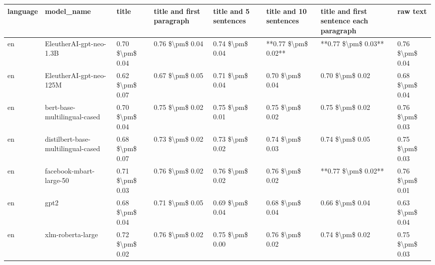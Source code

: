 \begin{tabular}{llllllll}
\toprule
language &                         model\_name &           title & title and first paragraph & title and 5 sentences & title and 10 sentences & title and first sentence each paragraph &            raw text \\
\midrule
      en &            EleutherAI-gpt-neo-1.3B & 0.70 \$\textbackslash pm\$ 0.04 &           0.76 \$\textbackslash pm\$ 0.04 &       0.74 \$\textbackslash pm\$ 0.04 &    **0.77 \$\textbackslash pm\$ 0.02** &                     **0.77 \$\textbackslash pm\$ 0.03** &     0.76 \$\textbackslash pm\$ 0.04 \\
      en &            EleutherAI-gpt-neo-125M & 0.62 \$\textbackslash pm\$ 0.07 &           0.67 \$\textbackslash pm\$ 0.05 &       0.71 \$\textbackslash pm\$ 0.04 &        0.70 \$\textbackslash pm\$ 0.04 &                         0.70 \$\textbackslash pm\$ 0.02 &     0.68 \$\textbackslash pm\$ 0.04 \\
      en &       bert-base-multilingual-cased & 0.70 \$\textbackslash pm\$ 0.04 &           0.75 \$\textbackslash pm\$ 0.02 &       0.75 \$\textbackslash pm\$ 0.01 &        0.75 \$\textbackslash pm\$ 0.02 &                         0.75 \$\textbackslash pm\$ 0.02 &     0.76 \$\textbackslash pm\$ 0.03 \\
      en & distilbert-base-multilingual-cased & 0.68 \$\textbackslash pm\$ 0.07 &           0.73 \$\textbackslash pm\$ 0.02 &       0.73 \$\textbackslash pm\$ 0.02 &        0.74 \$\textbackslash pm\$ 0.03 &                         0.74 \$\textbackslash pm\$ 0.05 &     0.75 \$\textbackslash pm\$ 0.03 \\
      en &            facebook-mbart-large-50 & 0.71 \$\textbackslash pm\$ 0.03 &           0.76 \$\textbackslash pm\$ 0.02 &       0.76 \$\textbackslash pm\$ 0.02 &        0.76 \$\textbackslash pm\$ 0.02 &                     **0.77 \$\textbackslash pm\$ 0.02** &     0.76 \$\textbackslash pm\$ 0.01 \\
      en &                               gpt2 & 0.68 \$\textbackslash pm\$ 0.04 &           0.71 \$\textbackslash pm\$ 0.05 &       0.69 \$\textbackslash pm\$ 0.04 &        0.68 \$\textbackslash pm\$ 0.04 &                         0.66 \$\textbackslash pm\$ 0.04 &     0.63 \$\textbackslash pm\$ 0.04 \\
      en &                  xlm-roberta-large & 0.72 \$\textbackslash pm\$ 0.02 &           0.76 \$\textbackslash pm\$ 0.02 &       0.75 \$\textbackslash pm\$ 0.00 &        0.76 \$\textbackslash pm\$ 0.02 &                         0.74 \$\textbackslash pm\$ 0.02 &     0.75 \$\textbackslash pm\$ 0.03 \\

\end{tabular}
